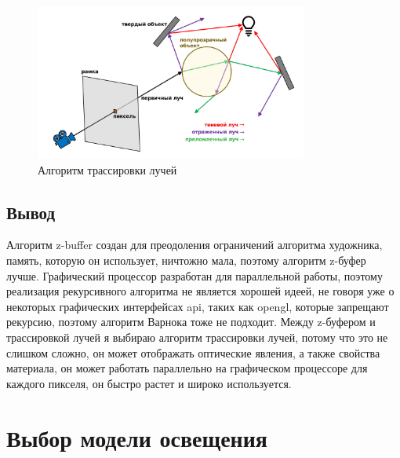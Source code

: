 \begin{figure}[ht]
  \centering
  \includegraphics[width=0.8\textwidth]{img/raytracing.png}
  \caption{Алгоритм трассировки лучей}
\end{figure}




\subsection*{Вывод}



Алгоритм z-buffer создан для преодоления ограничений алгоритма художника, память, которую он использует, ничтожно мала, поэтому алгоритм z-буфер лучше. Графический процессор разработан для параллельной работы, поэтому реализация рекурсивного алгоритма не является хорошей идеей, не говоря уже о некоторых графических интерфейсах api, таких как opengl, которые запрещают рекурсию, поэтому алгоритм Варнока тоже не подходит.
Между z-буфером и трассировкой лучей я выбираю алгоритм трассировки лучей, потому что это не слишком сложно, он может отображать оптические явления, а также свойства материала, он может работать параллельно на графическом процессоре для каждого пикселя, он быстро растет и широко используется.




\section{Выбор модели освещения}

